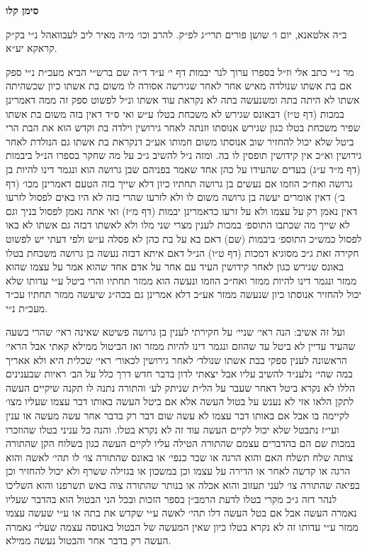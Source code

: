 \documentclass[12pt, openany]{book}
\newcommand{\chapname}{}
\newcommand{\newchap}[1]{
	\addcontentsline{toc}{chapter}{#1}
	\renewcommand{\chapname}{#1}
		\begin{center}
			\textbf{%
\fontsize{16pt}{16pt}\selectfont
				#1}
		\end{center}
}
\begin{document}
\newchap{סימן קלו}
\begin{multicols}{2}
ב״ה אלטאנא, יום ו׳ שושן פורים תרי״ג לפ״ק. להרב וכו׳ מ״ה מאיר ליב לעבוואהל נ״י בק״ק קראקא יע״א.\\\vspace{0pt}

מר נ״י כתב אלי וז״ל בספרו ערוך לנר יבמות דף י׳ ע״ד ד״ה שם ברש״י הביא מעכ״ת נ״י ספק אם בת אשתו שנולדה מאיש אחר לאחר שגירשה אסורה לו משום בת אשתו כיון שכשהיתה אשתו לא היתה בתה ומשנעשה בתה לא נקראת עוד אשתו ונ״ל לפשוט ספק זה ממה דאמרינן במכות (דף ט״ז) דבאונס שגירש לא משכחת בטלו ע״ש ואי ס״ד דאין בזה משום בת אשתו שפיר משכחת בטלו כגון שגירש אנוסתו וזנתה לאחר גירושין וילדה בת וקדש הוא את הבת הרי ביטל שלא יכול להחזיר שוב אנוסתו משום חמותו אע״כ דנקראת בת אשתו גם הנולדת לאחר גירושין וא״כ אין קידושין תופסין לו בה. ומזה נ״ל להשיב ג״כ על מה שחקר בספרו הנ״ל ביבמות (דף מ״ד ע״ג) בעדים שהעידו על כהן אחד שאמר בפניהם שבן גרושה הוא ונגמר דינו להיות בן גרושה ואח״כ הוזמו אם נעשים בן גרושה תחתיו כיון דלא שייך בזה הטעם דאמרינן מכו׳ (דף ב׳) דאין אומרים יעשה בן גרושה משום לו ולא לזרעו שהרי בזה לא היו באים לפסול לזרעו דאין נאמן רק על עצמו ולא על זרעו כדאמרינן יבמות (דף מ״ז) ואי אתה נאמן לפסול בניך וגם לא שייך מה שכתבו התוספ׳ במכות לענין מצרי שני מלו ולא לאשתו דבזה גם אשתו לא באו לפסול כמש״כ התוספ׳ ביבמות (שם) דאם בא על בת כהן לא פסלה ע״ש ולפי דעתי יש לפשוט חקירה זאת ג״כ מסוגיא דמכות (דף ט״ו) הנ״ל דאם איתא דבזה נעשה בן גרושה משכחת בטלו באונס שגירש כגון לאחר קידושין העיד עם אחר על אדם אחד שהוא אמר על עצמו שהוא ממזר ונגמר דינו להיות ממזר ואח״כ הוזמו ונעשה הוא ממזר תחתיו והרי ביטל ע״י עדותו שלא יכול להחזיר אנוסתו כיון שנעשה ממזר אע״כ דלא אמרינן גם בכה״ג שיעשה ממזר תחתיו עכ״ד מעכ״ת נ״י.\\\vspace{0pt}

ועל זה אשיב: הנה ראי׳ שניי׳ על חקירתי לענין בן גרושה פשיטא שאינה ראי׳ שהרי בשעה שהעיד עדיין לא ביטל עד שהוזם ונגמר דינו להיות ממזר ואז הביטול ממילא קאתי אבל הראי׳ הראשונה לענין ספקי בבת אשתו שנולד׳ לאחר גירושין לכאור׳ ראי׳ שכלית היא ולא אאריך במה שהי׳ נלענ״ד להשיב עליו אבל יצאתי לדון בדבר חדש דרך כלל על הב׳ ראיות שבענינים הללו לא נקרא ביטל דאחר שעבר על הל״ת שניתק לע׳ והתורה נתנה לו תקנה שיקיים העשה לתקן הלאו אזי לא נענש על בטול העשה אלא אם ביטל העשה באותו דבר עצמו שעליו מצו׳ לקיימה בו אבל אם באותו דבר עצמו לא עשה שום דבר רק בדבר אחר עשה מעשה או ענין ועי״ז נתבטל שלא יכול לקיים העשה עוד זה לא נקרא בטלו. והנה כל עניני בטלו שהוזכרו במכות שם הם בהדברים עצמם שהתורה הטילה עליו לקיים העשה כגון בשלוח הקן שהתורה צותה שלח תשלח האם והוא הרגה או שבר כנפי׳ או באונס שהתורה צו׳ לו תהי׳ לאשה והוא הרגה או קדשה לאחר או הדירה על עצמו וכן במשכון או בגזילה ששרף ולא יכול להחזיר וכן בפיאה שהתורה צו׳ לעני תעזוב והוא אכלה או בנותר שהתורה צוה באש תשרפנו והוא השליכו לנהר דזה ג״כ מקרי בטלו לדעת הרמב״ן בספר הזכות ובכל הני הבטול הוא בהדבר שעליו נאמרה העשה אבל אם בטל העשה דלו תהי׳ לאשה ע״י שקדש את בתה או ע״י שעשה עצמו ממזר ע״י עדותו זה לא נקרא בטלו כיון שאין המעשה של הבטול באנוסה עצמה שעלי׳ נאמרה העשה רק בדבר אחר והבטול נעשה ממילא.\\\vspace{0pt}


\end{multicols}
\end{document}

